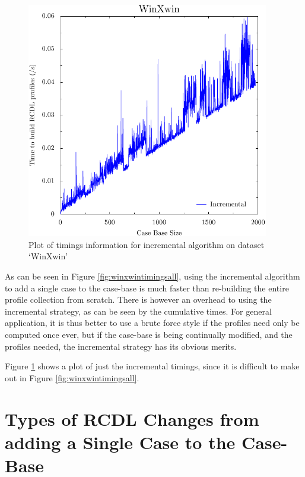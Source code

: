 \documentclass[a4paper,11pt]{report}
\begin{document}
\begin{figure}[h!] 
\centering
\includegraphics[width=300pt]{./ExperimentResults/WinXwin_timings_incr_only}
\caption{Plot of timings information for incremental algorithm on dataset `WinXwin'}
\label{fig:winxwintimingsincronly}
\end{figure}

\begin{samepage}
As can be seen in Figure \ref{fig:winxwintimingsall}, using the incremental algorithm to add a single case to the case-base is much faster than re-building the entire profile collection from scratch. There is however an overhead to using the incremental strategy, as can be seen by the cumulative times. For general application, it is thus better to use a brute force style if the profiles need only be computed once ever, but if the case-base is being continually modified, and the profiles needed, the incremental strategy has its obvious merits.

Figure \ref{fig:winxwintimingsincronly} shows a plot of just the incremental timings, since it is difficult to make out in Figure \ref{fig:winxwintimingsall}.
\end{samepage}


\section{Types of RCDL Changes from adding a Single Case to the Case-Base}
\end{document}
